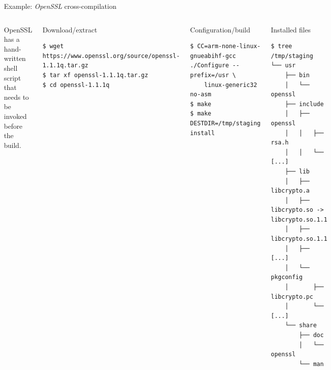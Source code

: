 \begin{frame}[fragile]{Example: {\em OpenSSL} cross-compilation}

  \begin{columns}
  OpenSSL has a hand-written  shell script that needs
  to be invoked before the build.

  \begin{block}{Download/extract}
    {\tiny
\begin{verbatim}
$ wget https://www.openssl.org/source/openssl-1.1.1q.tar.gz
$ tar xf openssl-1.1.1q.tar.gz
$ cd openssl-1.1.1q
\end{verbatim}
    }
  \end{block}

  \begin{block}{Configuration/build}
    {\tiny
\begin{verbatim}
$ CC=arm-none-linux-gnueabihf-gcc ./Configure --prefix=/usr \
    linux-generic32 no-asm
$ make
$ make DESTDIR=/tmp/staging install
\end{verbatim}
    }
  \end{block}
  \begin{block}{Installed files}
    {\tiny
\begin{verbatim}
$ tree /tmp/staging
└── usr
    ├── bin
    │   └── openssl
    ├── include
    │   ├── openssl
    │   │   ├── rsa.h
    │   │   └── [...]
    ├── lib
    │   ├── libcrypto.a
    │   ├── libcrypto.so -> libcrypto.so.1.1
    │   ├── libcrypto.so.1.1
    │   ├── [...]
    │   └── pkgconfig
    │       ├── libcrypto.pc
    │       └── [...]
    └── share
        ├── doc
        │   └── openssl
        └── man
\end{verbatim}
    }
  \end{block}
\end{columns}
\end{frame}

